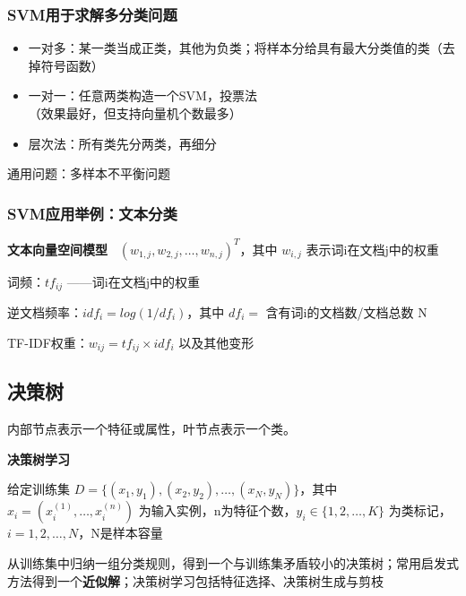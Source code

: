 \documentclass[b4paper, 10pt]{ctexart}
\makeatletter
\newenvironment{figurehere}
{\def\@captype{figure}}
{}
\makeatother
\begin{document}
\begin{multicols}{3}
\subsubsection{SVM用于求解多分类问题}
\begin{itemize}
    \item 一对多：某一类当成正类，其他为负类；将样本分给具有最大分类值的类（去掉符号函数）
    \item 一对一：任意两类构造一个SVM，投票法
    \\（效果最好，但支持向量机个数最多）
    \item 层次法：所有类先分两类，再细分
\end{itemize}

通用问题：多样本不平衡问题

\subsubsection{SVM应用举例：文本分类}

\textbf{文本向量空间模型\ } $(w_{1,j},w_{2,j},\dots,w_{n,j})^T$，其中 $w_{i,j}$ 表示词i在文档j中的权重

词频：$tf_{ij}$ ——词i在文档j中的权重

逆文档频率：$idf_i=log(1/df_i)$，其中 $df_i=$ 含有词i的文档数/文档总数 N

TF-IDF权重：$w_{ij}=tf_{ij}\times idf_i$ 以及其他变形

\subsection{决策树}
内部节点表示一个特征或属性，叶节点表示一个类。


\textbf{决策树学习\ } 

给定训练集 $D=\{(x_1,y_1),(x_2,y_2),\dots,(x_N,y_N)\}$，其中 $x_i=(x_i^{(1)},\dots,x_i^{(n)})$ 为输入实例，n为特征个数，$y_i\in \{1,2,\dots,K\}$ 为类标记，$i=1,2,\dots,N$，N是样本容量

从训练集中归纳一组分类规则，得到一个与训练集矛盾较小的决策树；常用启发式方法得到一个\textbf{近似解}；决策树学习包括特征选择、决策树生成与剪枝 


\end{multicols}
\end{document}
